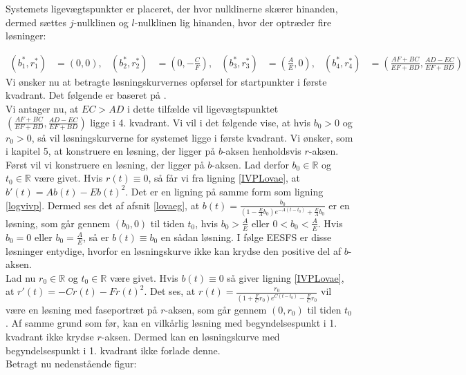 Systemets ligevægtspunkter er placeret, der hvor nulklinerne skærer hinanden, dermed sættes $j$-nulklinen og $l$-nulklinen lig hinanden, hvor der optræder fire  løsninger: 

\begin{align*}
    (b^*_1,r^*_1)&= (0,0), & (b^*_2,r^*_2)&= \left(0,-\frac{C}{F}\right), & (b^*_3,r^*_3)&= \left(\frac{A}{E},0\right), & (b^*_4,r^*_4)&= \left(\frac{AF+BC}{EF+BD},\frac{AD-EC}{EF+BD}\right)
\end{align*}
\hfill \break
Vi ønsker nu at betragte løsningskurvernes opførsel for startpunkter i første kvadrant. Det følgende er baseret på \citep[s. 257-259]{Svensk}.\hfill \break \\
Vi antager nu, at $EC>AD$ i dette tilfælde vil ligevægtspunktet $\left(\frac{AF+BC}{EF+BD},\frac{AD-EC}{EF+BD}\right)$ ligge i 4. kvadrant. 
Vi vil i det følgende vise, at hvis $b_0>0$ og $r_0>0$, så vil løsningskurverne for systemet ligge i første kvadrant. Vi ønsker, som i kapitel 5, at konstruere en løsning, der ligger på $b$-aksen henholdsvis $r$-aksen.\\ 
\hfill \break
Først vil vi konstruere en løsning, der ligger på $b$-aksen. Lad derfor $b_0 \in \mathbb{R}$ og $t_0 \in \mathbb{R}$ være givet. Hvis $r(t)\equiv 0$, så får vi fra ligning \eqref{IVPLovae}, at $b'(t)=Ab(t)-Eb(t)^2$. Det er en ligning på samme form som ligning \eqref{logvivp}. Dermed ses det af afsnit \ref{lovaeg}, at $b(t)= \frac{b_0}{ \left(1- \frac{E}{A}b_0 \right)e^{-A(t-t_0)}+ \frac{E}{A}b_0}$ er en løsning, som går gennem $(b_0,0)$ til tiden $t_0$, hvis $b_0>\frac{A}{E}$ eller $0<b_0<\frac{A}{E}$. Hvis $b_0=0$ eller $b_0=\frac{A}{E}$, så er $b(t)\equiv b_0$ en sådan løsning. I følge EESFS er disse løsninger entydige, hvorfor en løsningskurve ikke kan krydse den positive del af $b$-aksen.
\\ \hfill \break
 Lad nu $r_0\in \mathbb{R}$ og $t_0\in \mathbb{R}$ være givet. Hvis $b(t)\equiv 0$ så giver  ligning \eqref{IVPLovae}, at $r'(t)=-Cr(t)-Fr(t)^2$. Det ses, at $r(t)=\frac{r_0}{(1+\frac{F}{C}r_0)e^{C(t-t_0)}-\frac{F}{C}r_0}$ vil være en løsning med faseportræt på $r$-aksen, som går gennem $(0,r_0)$ til tiden $t_0$. Af samme grund som før, kan en vilkårlig løsning med begyndelsespunkt i 1. kvadrant ikke krydse $r$-aksen. Dermed kan en løsningskurve med begyndelsespunkt i 1. kvadrant ikke forlade denne.\\ 
 \hfill \break
Betragt nu nedenstående figur:

